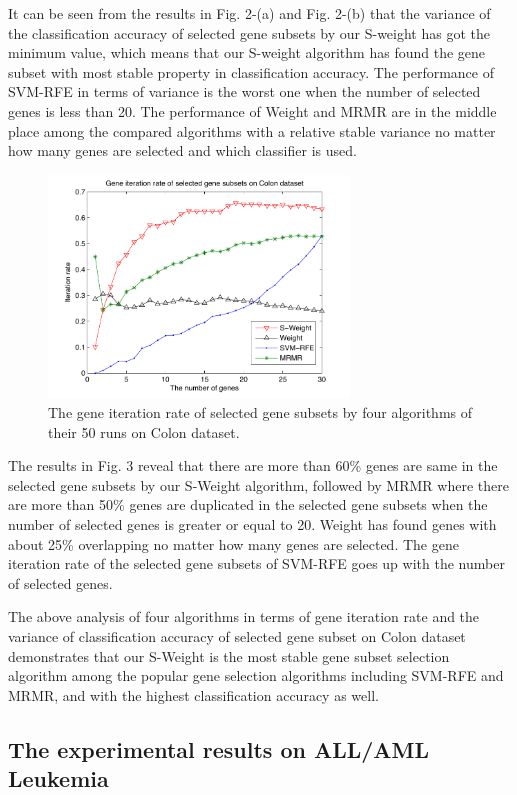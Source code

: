 \documentclass[runningheads,a4paper]{llncs}
\begin{document}
It can be seen from the results in Fig. 2-(a) and Fig. 2-(b) that the variance of the classification accuracy of selected gene subsets by our S-weight has got the minimum value, which means that our S-weight algorithm has found the gene subset with most stable property in classification accuracy. The performance of SVM-RFE in terms of variance is the worst one when the number of selected genes is less than 20. The performance of Weight and MRMR are in the middle place among the compared algorithms with a relative stable variance no matter how many genes are selected and which classifier is used. 

\begin{figure}
\centering    
\includegraphics[width=8cm]{fig3.pdf}
\caption{ The gene iteration rate of selected gene subsets by four algorithms of their 50 runs on Colon dataset. }     
\label{fig:fig3}     
\end{figure}

The results in Fig. 3 reveal that there are more than 60\% genes are same in the selected gene subsets by our S-Weight algorithm, followed by MRMR where there are more than 50\% genes are duplicated in the selected gene subsets when the number of selected genes is greater or equal to 20. Weight has found genes with about 25\% overlapping no matter how many genes are selected. The gene iteration rate of the selected gene subsets of SVM-RFE goes up with the number of selected genes. 

The above analysis of four algorithms in terms of gene iteration rate and the variance of classification accuracy of selected gene subset on Colon dataset demonstrates that our S-Weight is the most stable gene subset selection algorithm among the popular gene selection algorithms including SVM-RFE and MRMR, and with the highest classification accuracy as well.


\subsection{The experimental results on ALL/AML Leukemia}
\end{document}
